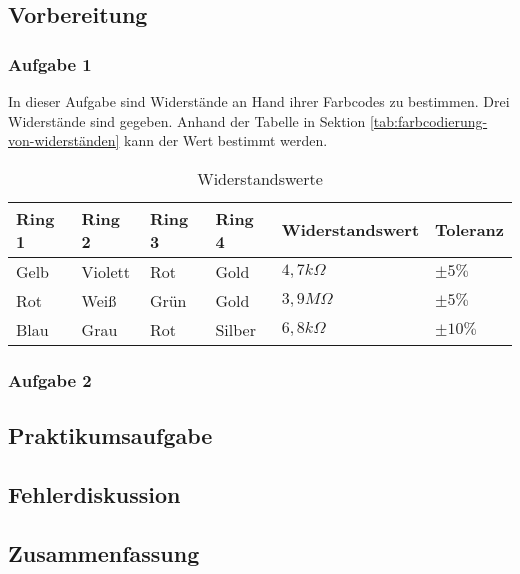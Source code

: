 \subsection{Vorbereitung}
\label{subsec:a4-vorbereitung}

\subsubsection{Aufgabe 1}

In dieser Aufgabe sind Widerstände an Hand ihrer Farbcodes zu bestimmen.
Drei Widerstände sind gegeben.
Anhand der Tabelle in Sektion \ref{tab:farbcodierung-von-widerständen} kann der Wert bestimmt werden.

\begin{table}[ht]
    \centering
    \caption{Widerstandswerte}
    \label{tab:a4-widerstandswerte}
    \begin{tabular}{| l | l | l | l | l | l |}
        \hline
        Ring 1 & Ring 2 & Ring 3 & Ring 4 & Widerstandswert & Toleranz \\
        \hline
        Gelb & Violett & Rot & Gold & $4,7k\Omega$ & $\pm5\%$ \\
        Rot & Weiß & Grün & Gold & $3,9M\Omega$ & $\pm5\%$ \\
        Blau & Grau & Rot & Silber & $6,8k\Omega$ & $\pm10\%$ \\
        \hline
    \end{tabular}
\end{table}

\subsubsection{Aufgabe 2}


\subsection{Praktikumsaufgabe}
\label{subsec:a4-praktikumsaufgabe2}

\subsection{Fehlerdiskussion}
\label{subsec:a4-fehlerdiskussion}

\subsection{Zusammenfassung}
\label{subsec:a4-zusammenfassung2}
